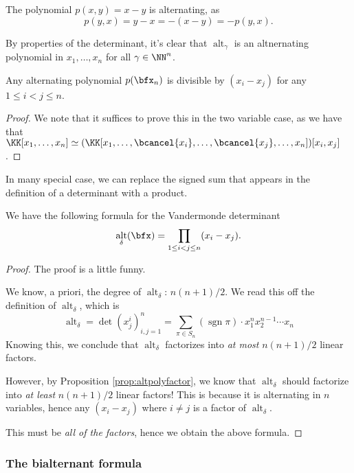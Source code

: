\documentclass{article}
\DeclareMathOperator{\sgn}{sgn}
\DeclareMathOperator{\alt}{alt}
\begin{document}
\begin{example}
    The polynomial $p(x,y) = x-y$ is alternating, as
    \[
        p(y,x) = y-x = -(x-y) = -p(y,x).
    \]
\end{example}

By properties of the determinant, it's clear that $\alt_\gamma$ is an altnernating polynomial in $x_1,\ldots,x_n$ for all $\gamma \in \NN^n$.

\begin{proposition} \label{prop:altpolyfactor}
    Any alternating polynomial $p(\bfx_n)$ is divisible by $(x_i - x_j)$ for any $1 \leq i < j \leq n$.
\end{proposition}

\begin{proof}
    We note that it suffices to prove this in the two variable case, as we have that $\KK[x_1,\ldots,x_n] \simeq (\KK[x_1,\ldots,\bcancel{x_i},\ldots,\bcancel{x_j},\ldots,x_n])[x_i,x_j]$.
\end{proof}

In many special case, we can replace the signed sum that appears in the definition of a determinant with a product.

\begin{theorem}
    We have the following formula for the Vandermonde determinant
    \[
        \alt_\delta(\bfx) 
        = 
        \prod_{1 \leq i < j \leq n} (x_i-x_j).
    \]
\end{theorem}

\begin{proof}
    The proof is a little funny.

    We know, a priori, the degree of $\alt_\delta$: $n(n+1)/2$. We read this off the definition of $\alt_\delta$, which is
    \[
        \alt_\delta = \det\left(x_j^{i}\right)_{i,j=1}^n = \sum_{\pi \in S_n} (\sgn \pi) \cdot x_1^nx_2^{n-1}\cdots x_n
    \]
    Knowing this, we conclude that $\alt_\delta$ factorizes into \textit{at most} $n(n+1)/2$ linear factors.

    However, by Proposition \ref{prop:altpolyfactor}, we know that $\alt_\delta$ should factorize into \textit{at least} $n(n+1)/2$ linear factors!
    This is because it is alternating in $n$ variables, hence any $(x_i - x_j)$ where $i \neq j$ is a factor of $\alt_\delta$.

    This must be \textit{all of the factors}, hence we obtain the above formula.
\end{proof}
    

\subsubsection{The bialternant formula}
\end{document}
